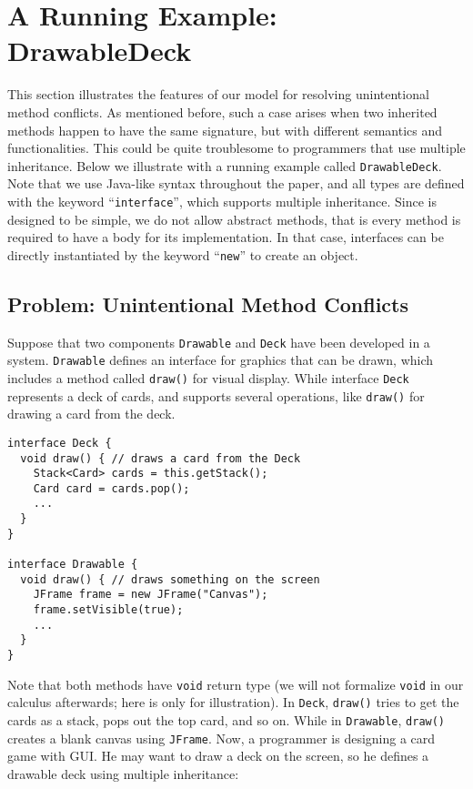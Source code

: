 \section{A Running Example: DrawableDeck}

This section illustrates the features of our \MIM{} model for resolving unintentional method
conflicts. As mentioned before, such a case arises when two inherited methods happen to have the
same signature, but with different semantics and functionalities. This could be quite troublesome
to programmers that use multiple inheritance. Below we illustrate with a running example called \lstinline|DrawableDeck|.
Note that we use Java-like syntax throughout the paper, and all types are defined with the keyword ``\lstinline|interface|'', which
supports multiple inheritance. Since \MIM{} is designed to be simple, we do not allow abstract methods, that is every method
is required to have a body for its implementation. In that case, interfaces can be directly instantiated by the keyword ``\lstinline|new|''
to create an object.

\subsection{Problem: Unintentional Method Conflicts}

Suppose that two components \lstinline|Drawable| and \lstinline|Deck| have been developed in a system.
\lstinline|Drawable| defines an interface for graphics that can be drawn, which includes a method called \lstinline|draw()|
for visual display. While interface \lstinline|Deck| represents a deck of cards, and supports several operations, like
\lstinline|draw()| for drawing a card from the deck.

\begin{lstlisting}
interface Deck {
  void draw() { // draws a card from the Deck
    Stack<Card> cards = this.getStack();
    Card card = cards.pop();
    ...
  }
}

interface Drawable {
  void draw() { // draws something on the screen
    JFrame frame = new JFrame("Canvas");
    frame.setVisible(true);
    ...
  }
}
\end{lstlisting}
Note that both methods have \lstinline|void| return type (we will not formalize
\lstinline|void| in our calculus afterwards; here is only for illustration). In \lstinline|Deck|, \lstinline|draw()| tries to get the cards as a stack, pops
out the top card, and so on. While in \lstinline|Drawable|, \lstinline|draw()|
creates a blank canvas using \lstinline|JFrame|. Now, a programmer is designing a
card game with GUI. He may want to draw a deck on the screen, so he defines a drawable
deck using multiple inheritance:

